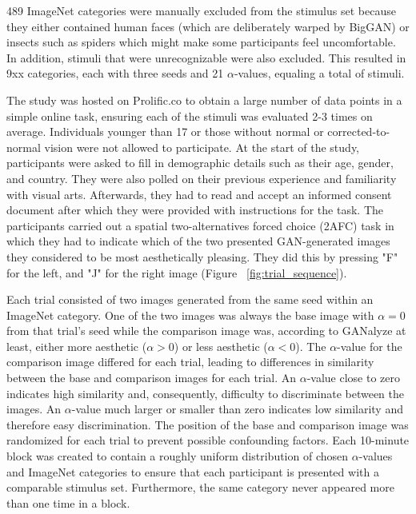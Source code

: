 \documentclass[../main.tex]{subfiles}
\begin{document}
	489 ImageNet categories were manually excluded from the stimulus set because they either contained human faces (which are deliberately warped by BigGAN) or insects such as spiders which might make some participants feel uncomfortable. In addition, stimuli that were unrecognizable were also excluded. This resulted in 9xx categories, each with three seeds and 21 $\alpha$-values, equaling a total of \totalstimuli{} stimuli.
	
	The study was hosted on Prolific.co to obtain a large number of data points in a simple online task, ensuring each of the \totalstimuli{} stimuli was evaluated 2-3 times on average. Individuals younger than 17 or those without normal or corrected-to-normal vision were not allowed to participate. At the start of the study, participants were asked to fill in demographic details such as their age, gender, and country. They were also polled on their previous experience and familiarity with visual arts. Afterwards, they had to read and accept an informed consent document after which they were provided with instructions for the task.
	The participants carried out a spatial two-alternatives forced choice (2AFC) task in which they had to indicate which of the two presented GAN-generated images they considered to be most aesthetically pleasing. They did this by pressing "F" for the left, and "J" for the right image (Figure ~\ref{fig:trial_sequence}).
	
	Each trial consisted of two images generated from the same seed within an ImageNet category. One of the two images was always the base image with $\alpha = 0$ from that trial’s seed while the comparison image was, according to GANalyze at least, either more aesthetic ($\alpha > 0$) or less aesthetic ($\alpha < 0$). The $\alpha$-value for the comparison image differed for each trial, leading to differences in similarity between the base and comparison images for each trial. An $\alpha$-value close to zero indicates high similarity and, consequently, difficulty to discriminate between the images. An $\alpha$-value much larger or smaller than zero indicates low similarity and therefore easy discrimination. The position of the base and comparison image was randomized for each trial to prevent possible confounding factors. Each 10-minute block was created to contain a roughly uniform distribution of chosen $\alpha$-values and ImageNet categories to ensure that each participant is presented with a comparable stimulus set. Furthermore, the same category never appeared more than one time in a block.
	
\end{document}
